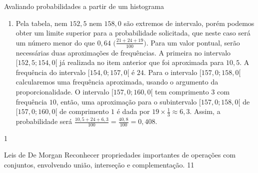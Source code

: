 \begin{answer}{Avaliando probabilidades a partir de um histograma}
{\begin{enumerate}
\item Pela tabela, nem $152,5$ nem $158,0$ são extremos de intervalo, porém podemos obter um limite superior para a probabilidade solicitada, que neste caso será um número menor do que $0,64$ $\big(\frac{21+24+19}{100}\big)$. Para um valor pontual, serão necessárias duas aproximações de frequências. A primeira no intervalo $[152{,}5; 154{,}0[$ já realizada no item anterior que foi aproximada para $10{,}5$. A frequência do intervalo $[154{,}0 ; 157{,}0 [$ é $24$. Para o intervalo $[157{,}0 ; 158{,}0[$ calcularemos uma frequência aproximada, usando o argumento da proporcionalidade. O intervalo $[157{,}0 ; 160{,}0[$ tem comprimento $3$ com frequência $10$, então, uma aproximação para o subintervalo $[157{,}0 ; 158{,}0[$ de $[157{,}0 ; 160{,}0[$ de comprimento $1$ é dada por $19\times\frac{1}{3}\approx6{,}3$. Assim, a probabilidade será $\frac{10{,}5+24+6{,}3}{100}=\frac{40{,}8}{100}=0{,}408$.
\end{enumerate}
}{1}
\end{answer}
\begin{objectives}{Leis de De Morgan}
{
Reconhecer propriedades importantes de operações com conjuntos, envolvendo união, interseção e complementação.
}{1}{1}
\end{objectives}
